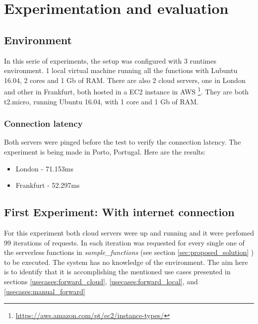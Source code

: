 \section{Experimentation and evaluation}
\subsection{Environment}
In this serie of experiments, the setup was configured with 3 runtimes environment.
1 local virtual machine running all the functions with Lubuntu 16.04, 2 cores and
1 Gb of RAM. There are also 2 cloud servers, one in London and other in Frankfurt,
both  hosted in a EC2 instance in AWS
\footnote{\url{https://aws.amazon.com/pt/ec2/instance-types/}}. They are both
t2.micro, running Ubuntu 16.04, with 1 core and 1 Gb of RAM.

\subsubsection*{Connection latency}
\label{res:conn_latency}
Both servers were pinged before the test to verify the connection latency. The
experiment is being made in Porto, Portugal. Here are the results: 
\begin{itemize}
    \item London - 71.153ms
    \item Frankfurt - 52.297ms
\end{itemize}


\subsection{First Experiment: With internet connection}
For this experiment both cloud servers were up and running and it were perfomed
99 iterations of requests. In each iteration was requested for every single one
of the serverless functions in \textit{sample\_functions} (see
section \ref{sec:proposed_solution} ) to be executed.
The system has no knowledge of the environment. The aim here is to identify
that it is accomplishing the mentioned use cases presented in sections \ref{usecases:forward_cloud},
\ref{usecases:forward_local}, and \ref{usecases:manual_forward}


